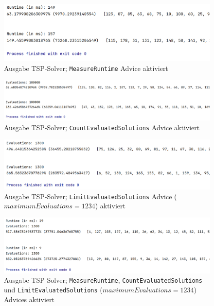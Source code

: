 \documentclass[german,notitlepage,smartquotes]{hgbreport}
\begin{document}
\begin{figure}[h]
\centering
\includegraphics[width=.9\textwidth]{tsp-test-01}
\caption{Ausgabe TSP-Solver; \texttt{MeasureRuntime} Advice aktiviert}
\label{tsp-test-01}
\end{figure}

\begin{figure}[h]
\centering
\includegraphics[width=.9\textwidth]{tsp-test-02}
\caption{Ausgabe TSP-Solver; \texttt{CountEvaluatedSolutions} Advice aktiviert}
\label{tsp-test-02}
\end{figure}

\begin{figure}[h]
\centering
\includegraphics[width=.9\textwidth]{tsp-test-03}
\caption{Ausgabe TSP-Solver; \texttt{LimitEvaluatedSolutions} Advice ($maximumEvaluations=1234$) aktiviert}
\label{tsp-test-03}
\end{figure}

\begin{figure}[h]
\centering
\includegraphics[width=.9\textwidth]{tsp-test-04}
\caption{Ausgabe TSP-Solver; \texttt{MeasureRuntime}, \texttt{CountEvaluatedSolutions} und \texttt{LimitEvaluatedSolutions} ($maximumEvaluations=1234$) Advices aktiviert}
\label{tsp-test-04}
\end{figure}
\end{document}
